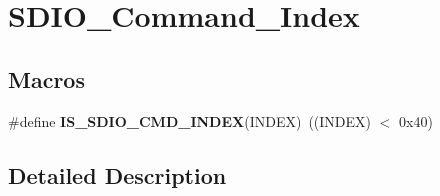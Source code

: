\hypertarget{group___s_d_i_o___command___index}{}\section{S\+D\+I\+O\+\_\+\+Command\+\_\+\+Index}
\label{group___s_d_i_o___command___index}
\subsection*{Macros}
\begin{DoxyCompactItemize}
\item 
\hypertarget{group___s_d_i_o___command___index_gae988f9f37c4ebb5f5f9866acb30f2880}{}\#define {\bfseries I\+S\+\_\+\+S\+D\+I\+O\+\_\+\+C\+M\+D\+\_\+\+I\+N\+D\+E\+X}(I\+N\+D\+E\+X)~((I\+N\+D\+E\+X) $<$ 0x40)\label{group___s_d_i_o___command___index_gae988f9f37c4ebb5f5f9866acb30f2880}

\end{DoxyCompactItemize}


\subsection{Detailed Description}
